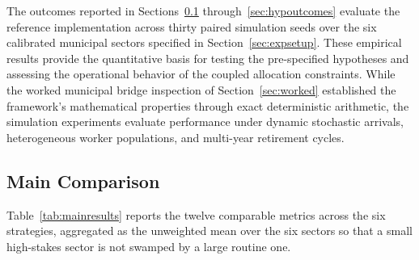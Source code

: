 	The outcomes reported in Sections~\ref{sec:mainresults} through~\ref{sec:hypoutcomes} evaluate the reference implementation across thirty paired simulation seeds over the six calibrated municipal sectors specified in Section~\ref{sec:expsetup}. These empirical results provide the quantitative basis for testing the pre-specified hypotheses and assessing the operational behavior of the coupled allocation constraints. While the worked municipal bridge inspection of Section~\ref{sec:worked} established the framework's mathematical properties through exact deterministic arithmetic, the simulation experiments evaluate performance under dynamic stochastic arrivals, heterogeneous worker populations, and multi-year retirement cycles.
	
	\subsection{Main Comparison}
	\label{sec:mainresults}
	
	Table~\ref{tab:mainresults} reports the twelve comparable metrics across the six strategies, aggregated as the unweighted mean over the six sectors so that a small high-stakes sector is not swamped by a large routine one.
	
